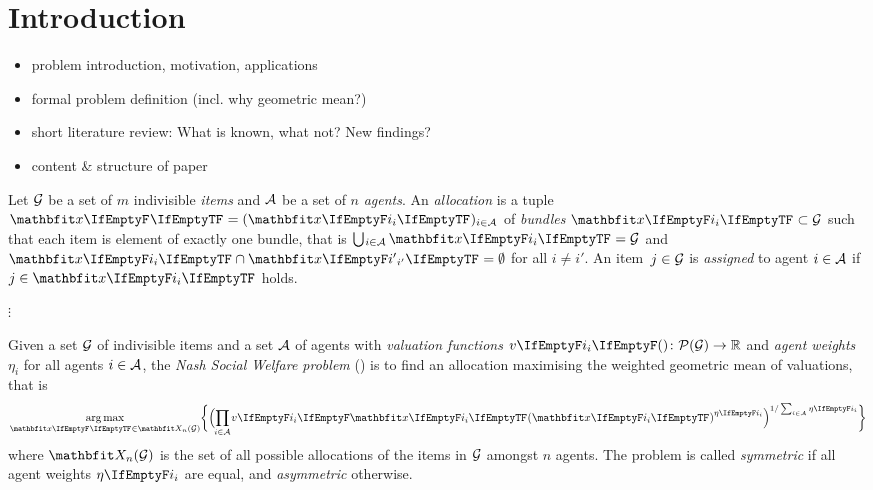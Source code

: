 \section{Introduction}
\label{sec:intro}

\begin{itemize}
	\item
	problem introduction, motivation, applications

	\item
	formal problem definition (incl. why geometric mean?)

	\item
	short literature review: What is known, what not? New findings?

	\item
	content \& structure of paper
\end{itemize}

\begin{definition}
	Let \(\mathcal{G}\) be a set of \(m\) indivisible \emph{items} and \(\mathcal{A}\) be a set of \(n\) \emph{agents}.
	An \emph{allocation} is a tuple \(\alloc[][] = (\alloc)_{i \in \agents}\) of \emph{bundles} \(\alloc \subset \goods\) such that each item is element of exactly one bundle, that is \(\mathop{\bigcup\hspace{-1pt}_{i \in \agents}} \alloc = \goods\) and \(\alloc \cap \alloc[][i'] = \emptyset\) for all \(i \neq i'\).
	An item~\(j \in \mathcal{G}\) is \emph{assigned} to agent \(i \in \mathcal{A}\) if \(j \in \alloc\) holds.
\end{definition}

\(\vdots\)

\begin{problem}
	Given a set \(\mathcal{G}\) of indivisible items and a set \(\mathcal{A}\) of agents with \emph{valuation functions} \(\valuations \colon \powerset[\goods] \to \real\) and \emph{agent weights} \(\eta_i\) for all agents \(i \in \mathcal{A}\), the \emph{Nash Social Welfare problem} (\NSW) is to find an allocation maximising the weighted geometric mean of valuations, that is
	\begin{equation*}
		\argmax_{\alloc[][] \in \allallocs{n}{\goods}} \braces[\bigg]{ \paren[\Big]{ \smashoperator{\prod_{i \in \agents}} \valuations[\alloc]^{\weight} }^{1 / \sum_{i \in \agents} \weight} }
	\end{equation*}
	where \(\allallocs{n}{\goods}\) is the set of all possible allocations of the items in \(\mathcal{G}\) amongst \(n\) agents.
	The problem is called \emph{symmetric} if all agent weights \(\weight\) are equal, and \emph{asymmetric} otherwise.
\end{problem}

